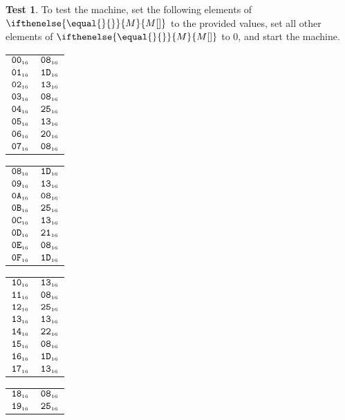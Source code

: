 \documentclass[a4paper,12pt]{article}
\makeatletter
\newcommand{\num}[1]{\texttt{#1}}
\newcommand{\hex}[1]{\num{#1}_{\textup{\tiny 16}}}
\newcommand{\MEM}[1]{\ifthenelse{\equal{#1}{}}{M}{M[#1]}}
\theoremstyle{definition}
\newtheorem{test}{Test}
\newenvironment{memtable}{%
  \begin{trivlist}
    \item
    }{%
    \end{trivlist}}
\newenvironment{memcolumn}{%
  \begin{tabular}{@{}ll@{}}
    \hline}
    {%
    \hline
  \end{tabular}}
\newcommand{\memspace}{\qquad}
\makeatother
\begin{document}
\begin{test}
  To test the machine, set the following elements of $\MEM{}$ to the provided values, set all other elements of $\MEM{}$ to 0, and start the machine.
  \begin{memtable}
    \begin{memcolumn}
      $\hex{00}$ & $\hex{08}$ \\
      $\hex{01}$ & $\hex{1D}$ \\
      $\hex{02}$ & $\hex{13}$ \\
      $\hex{03}$ & $\hex{08}$ \\
      $\hex{04}$ & $\hex{25}$ \\
      $\hex{05}$ & $\hex{13}$ \\
      $\hex{06}$ & $\hex{20}$ \\
      $\hex{07}$ & $\hex{08}$ \\
    \end{memcolumn}
    \memspace
    \begin{memcolumn}
      $\hex{08}$ & $\hex{1D}$ \\
      $\hex{09}$ & $\hex{13}$ \\
      $\hex{0A}$ & $\hex{08}$ \\
      $\hex{0B}$ & $\hex{25}$ \\
      $\hex{0C}$ & $\hex{13}$ \\
      $\hex{0D}$ & $\hex{21}$ \\
      $\hex{0E}$ & $\hex{08}$ \\
      $\hex{0F}$ & $\hex{1D}$ \\
    \end{memcolumn}
    \memspace
    \begin{memcolumn}
      $\hex{10}$ & $\hex{13}$ \\
      $\hex{11}$ & $\hex{08}$ \\
      $\hex{12}$ & $\hex{25}$ \\
      $\hex{13}$ & $\hex{13}$ \\
      $\hex{14}$ & $\hex{22}$ \\
      $\hex{15}$ & $\hex{08}$ \\
      $\hex{16}$ & $\hex{1D}$ \\
      $\hex{17}$ & $\hex{13}$ \\
    \end{memcolumn}
    \memspace
    \begin{memcolumn}
      $\hex{18}$ & $\hex{08}$ \\
      $\hex{19}$ & $\hex{25}$ \\

\end{memcolumn}
\end{memtable}
\end{test}
\end{document}
